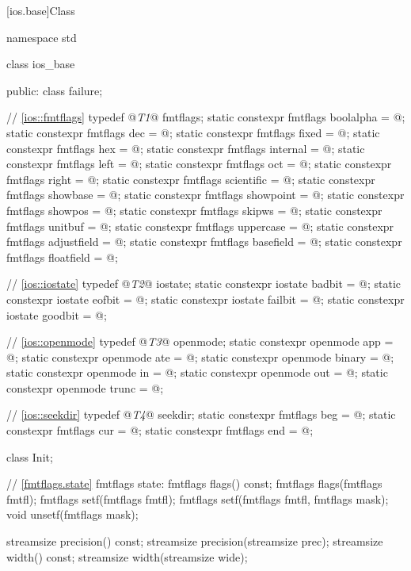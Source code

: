 [ios.base]{Class }
%
\begin{codeblock}
namespace std {
  class ios_base {
  public:
    class failure;

    // \ref{ios::fmtflags} 
    typedef @\textit{T1}@ fmtflags;
    static constexpr fmtflags boolalpha = @\unspec@;
    static constexpr fmtflags dec = @\unspec@;
    static constexpr fmtflags fixed = @\unspec@;
    static constexpr fmtflags hex = @\unspec@;
    static constexpr fmtflags internal = @\unspec@;
    static constexpr fmtflags left = @\unspec@;
    static constexpr fmtflags oct = @\unspec@;
    static constexpr fmtflags right = @\unspec@;
    static constexpr fmtflags scientific = @\unspec@;
    static constexpr fmtflags showbase = @\unspec@;
    static constexpr fmtflags showpoint = @\unspec@;
    static constexpr fmtflags showpos = @\unspec@;
    static constexpr fmtflags skipws = @\unspec@;
    static constexpr fmtflags unitbuf = @\unspec@;
    static constexpr fmtflags uppercase = @\unspec@;
    static constexpr fmtflags adjustfield = @\seebelow@;
    static constexpr fmtflags basefield = @\seebelow@;
    static constexpr fmtflags floatfield = @\seebelow@;

    // \ref{ios::iostate} 
    typedef @\textit{T2}@ iostate;
    static constexpr iostate badbit = @\unspec@;
    static constexpr iostate eofbit = @\unspec@;
    static constexpr iostate failbit = @\unspec@;
    static constexpr iostate goodbit = @\seebelow@;

    // \ref{ios::openmode} 
    typedef @\textit{T3}@ openmode;
    static constexpr openmode app = @\unspec@;
    static constexpr openmode ate = @\unspec@;
    static constexpr openmode binary = @\unspec@;
    static constexpr openmode in = @\unspec@;
    static constexpr openmode out = @\unspec@;
    static constexpr openmode trunc = @\unspec@;

    // \ref{ios::seekdir} 
    typedef @\textit{T4}@ seekdir;
    static constexpr fmtflags beg = @\unspec@;
    static constexpr fmtflags cur = @\unspec@;
    static constexpr fmtflags end = @\unspec@;

    class Init;

    // \ref{fmtflags.state} fmtflags state:
    fmtflags flags() const;
    fmtflags flags(fmtflags fmtfl);
    fmtflags setf(fmtflags fmtfl);
    fmtflags setf(fmtflags fmtfl, fmtflags mask);
    void unsetf(fmtflags mask);

    streamsize precision() const;
    streamsize precision(streamsize prec);
    streamsize width() const;
    streamsize width(streamsize wide);

}}
\end{codeblock}
